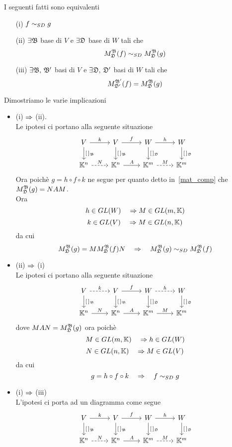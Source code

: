\spazio
\begin{prop}
I seguenti fatti sono equivalenti
\begin{itemize}
\item[(i)] $ f\sd g $
\item[(ii)] $\exists \B $ base di $V$ e $\exists \D$ base di $W$ tali che 
$$ \AB (f) \sd \AB(g)$$
\item[(iii)] $ \exists \B, \, \B' $ basi di $V$ e $\exists \D, \, \D'$ basi di $W$ tali che 
$$ M_{\D'}^{\B'} (f)= \AB (g)$$
\end{itemize}
\proof Dimostriamo le varie implicazioni
\begin{itemize}
\item (i) $\implica $ (ii).\\
Le ipotesi ci portano alla seguente situazione
$$ \begin{tikzcd} 
V \arrow[r,"k"] \arrow{d}{[\,]_\B } &V \arrow[r,"f"] \arrow{d}{[\,]_\B} & W \arrow[r,"h"] \arrow{d}{[\,]_\D }&W \arrow{d}{[\,]_\D }\\ \K^n \arrow[dashed,r,"N"] & \K^n \arrow[r,"A"] &\K^m \arrow[dashed, r,"M"]&\K^m
\end{tikzcd}$$
Ora poich\`e $ g = h \circ f \circ k $ ne segue per quanto detto in~\ref{mat_comp} che $\AB (g) = NAM $.\\
Ora 
$$ h\in GL(W) \quad \implica M \in GL(m,\K)$$
$$ k\in GL(V) \quad \implica M \in GL(n,\K)$$
da cui 
$$ \AB (g)= M \AB (f) N \quad \implica \quad \AB (g) \sd \AB(f)$$
\item (ii)  $\implica$ (i)\\
Le ipotesi ci portano alla seguente situazione
$$ \begin{tikzcd} 
V \arrow[dashed, r,"k"] \arrow{d}{[\,]_\B } &V \arrow[r,"f"] \arrow{d}{[\,]_\B} & W \arrow[dashed, r,"h"] \arrow{d}{[\,]_\D }&W \arrow{d}{[\,]_\D }\\ \K^n \arrow[r,"N"] & \K^n \arrow[r,"A"] &\K^m \arrow[r,"M"]&\K^m
\end{tikzcd}$$
dove $MAN=\AB (g)$ ora poich\`e 
$$ M\in GL(m,\K) \quad \implica h \in GL(W)$$
$$ N \in GL(n,\K) \quad \implica M \in GL(V)$$
da cui 
$$ g = h\circ f \circ k \quad \implica \quad f \sd g $$
\item  (i) $\implica$ (iii)\\
L'ipotesi ci porta ad un diagramma come segue 
$$ \begin{tikzcd} 
V \arrow[r,"k"] \arrow{d}{[\,]_\B } &V \arrow[r,"f"] \arrow{d}{[\,]_\B} & W \arrow[r,"h"] \arrow{d}{[\,]_\D }&W \arrow{d}{[\,]_\D }\\ \K^n \arrow[dashed,r,"N"] & \K^n \arrow[r,"A"] &\K^m \arrow[dashed, r,"M"]&\K^m

\end{tikzcd}$$
\end{itemize}
\end{prop}
